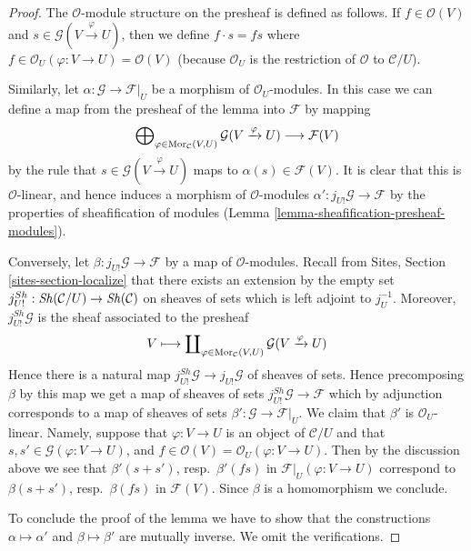 \begin{proof}
The $\mathcal{O}$-module structure on the presheaf is defined as
follows. If $f \in \mathcal{O}(V)$ and
$s \in \mathcal{G}(V \xrightarrow{\varphi} U)$, then
we define $f \cdot s = fs$ where
$f \in \mathcal{O}_U(\varphi : V \to U) = \mathcal{O}(V)$
(because $\mathcal{O}_U$ is the restriction of $\mathcal{O}$ to
$\mathcal{C}/U$).

\medskip\noindent
Similarly, let $\alpha : \mathcal{G} \to \mathcal{F}|_U$ be a
morphism of $\mathcal{O}_U$-modules. In this case we can define
a map from the presheaf of the lemma into $\mathcal{F}$ by mapping
$$
\bigoplus\nolimits_{\varphi \in \mathop{\mathrm{Mor}}\nolimits_\mathcal{C}(V, U)}
\mathcal{G}(V \xrightarrow{\varphi} U)
\longrightarrow
\mathcal{F}(V)
$$
by the rule that $s \in \mathcal{G}(V \xrightarrow{\varphi} U)$
maps to $\alpha(s) \in \mathcal{F}(V)$. It is clear that this is
$\mathcal{O}$-linear, and hence induces a morphism of
$\mathcal{O}$-modules $\alpha' : j_{U!}\mathcal{G} \to \mathcal{F}$
by the properties of sheafification of modules
(Lemma \ref{lemma-sheafification-presheaf-modules}).

\medskip\noindent
Conversely, let $\beta : j_{U!}\mathcal{G} \to \mathcal{F}$
by a map of $\mathcal{O}$-modules.
Recall from Sites, Section \ref{sites-section-localize}
that there exists an extension by the empty set
$j^{Sh}_{U!} : \mathop{\mathit{Sh}}\nolimits(\mathcal{C}/U) \to \mathop{\mathit{Sh}}\nolimits(\mathcal{C})$
on sheaves of sets which is left adjoint to $j_U^{-1}$.
Moreover, $j^{Sh}_{U!}\mathcal{G}$ is the sheaf associated to the presheaf
$$
V
\longmapsto
\coprod\nolimits_{\varphi \in \mathop{\mathrm{Mor}}\nolimits_\mathcal{C}(V, U)}
\mathcal{G}(V \xrightarrow{\varphi} U)
$$
Hence there is a natural map
$j^{Sh}_{U!}\mathcal{G} \to j_{U!}\mathcal{G}$ of sheaves of sets.
Hence precomposing $\beta$ by this map we get a map of sheaves of sets
$j^{Sh}_{U!}\mathcal{G} \to \mathcal{F}$ which by adjunction corresponds
to a map of sheaves of sets $\beta' : \mathcal{G} \to \mathcal{F}|_U$.
We claim that $\beta'$ is $\mathcal{O}_U$-linear. Namely, suppose
that $\varphi : V \to U$ is an object of $\mathcal{C}/U$ and that
$s, s' \in \mathcal{G}(\varphi : V \to U)$, and
$f \in \mathcal{O}(V) = \mathcal{O}_U(\varphi : V \to U)$.
Then by the discussion above we see that
$\beta'(s + s')$, resp.\  $\beta'(fs)$ in $\mathcal{F}|_U(\varphi : V \to U)$
correspond to $\beta(s + s')$, resp.\ $\beta(fs)$ in
$\mathcal{F}(V)$. Since $\beta$ is a homomorphism we conclude.

\medskip\noindent
To conclude the proof of the lemma we have to show that the constructions
$\alpha \mapsto \alpha'$ and $\beta \mapsto \beta'$ are mutually inverse.
We omit the verifications.
\end{proof}

